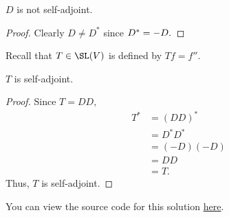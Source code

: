\documentclass{amsart}
\newcommand{\pagenum}{216}
\newcommand{\probnum}{21}
\begin{document}
\begin{claim*}
    $D$ is not self-adjoint.
\end{claim*}
\begin{proof}
    Clearly $D\ne D^*$ since $D^*=-D.\\$
\end{proof}

Recall that $T\in\SL(V)$ is defined by $Tf=f''.$
\begin{claim*}
    $T$ is self-adjoint.
\end{claim*}
\begin{proof}
Since $T=DD,$
\begin{align*}
    T^* &= (DD)^* \\
        &= D^*D^* \\
        &= (-D)(-D) \\
        &= DD \\
        &= T.
\end{align*}
Thus, $T$ is self-adjoint.
\end{proof}

\vspace{0.5in}

\begin{note*}
You can view the source code for this solution
\href{https://github.com/thomasbreydo/linalg/blob/main/\pagenum_\probnum_Thomas_Breydo.tex}
{here}.
\end{note*}
\end{document}
